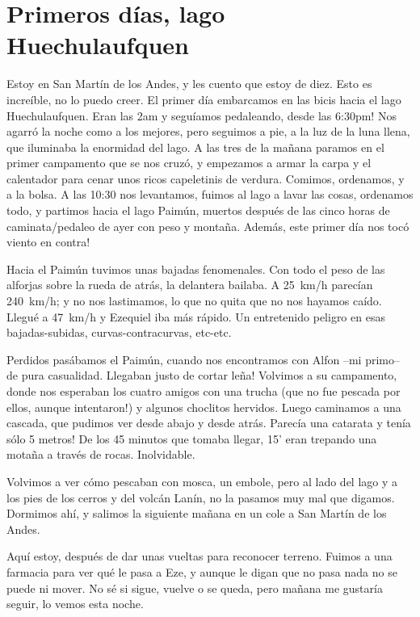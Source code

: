 \section{Primeros d\'ias, lago Huechulaufquen}

Estoy en San Mart\'in de los Andes, y les cuento que estoy de diez. Esto es
incre\'ible, no lo puedo creer. El primer d\'ia embarcamos en las bicis hacia el
lago Huechulaufquen. \textexclamdown Eran las 2am y segu\'iamos pedaleando,
desde las 6:30pm! Nos agarr\'o la noche como a los mejores, pero seguimos a pie,
a la luz de la luna llena, que iluminaba la enormidad del lago. A las tres de la
ma\~nana paramos en el primer campamento que se nos cruz\'o, y empezamos a armar
la carpa y el calentador para cenar unos ricos capeletinis de verdura. Comimos,
ordenamos, y a la bolsa. A las 10:30 nos levantamos, fuimos al lago a lavar las
cosas, ordenamos todo, y partimos hacia el lago Paim\'un, muertos despu\'es de
las cinco horas de caminata/pedaleo de ayer con peso y monta\~na.
\textexclamdown Adem\'as, este primer d\'ia nos toc\'o viento en contra!

Hacia el Paim\'un tuvimos unas bajadas fenomenales. Con todo el peso de las
alforjas sobre la rueda de atr\'as, la delantera bailaba. A 25~km/h parec\'ian
240~km/h; y no nos lastimamos, lo que no quita que no nos hayamos ca\'ido.
Llegu\'e a 47~km/h y Ezequiel iba m\'as r\'apido. Un entretenido peligro en esas
bajadas-subidas, curvas-contracurvas, etc-etc.

Perdidos pas\'abamos el Paim\'un, cuando nos encontramos con Alfon --mi primo--
de pura casualidad. \textexclamdown Llegaban justo de cortar le\~na! Volvimos a
su campamento, donde nos esperaban los cuatro amigos con una trucha (que no fue
pescada por ellos, \textexclamdown aunque intentaron!) y algunos choclitos
hervidos. Luego caminamos a una cascada, que pudimos ver desde abajo y desde
atr\'as. \textexclamdown Parec\'ia una catarata y ten\'ia s\'olo 5 metros! De
los 45 minutos que tomaba llegar, 15' eran trepando una mota\~na a trav\'es de
rocas. Inolvidable.

Volvimos a ver c\'omo pescaban con mosca, un embole, pero al lado del lago y a
los pies de los cerros y del volc\'an Lan\'in, no la pasamos muy mal que
digamos. Dormimos ah\'i, y salimos la siguiente ma\~nana en un cole a San
Mart\'in de los Andes.

Aqu\'i estoy, despu\'es de dar unas vueltas para reconocer terreno. Fuimos a una
farmacia para ver qu\'e le pasa a Eze, y aunque le digan que no pasa nada no se
puede ni mover. No s\'e si sigue, vuelve o se queda, pero ma\~nana me gustar\'ia
seguir, lo vemos esta noche.

